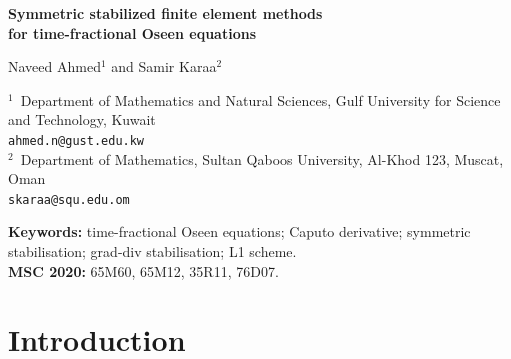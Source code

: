 \documentclass[11pt,a4paper]{article}
\numberwithin{equation}{section}
\theoremstyle{plain}
\theoremstyle{definition}
\theoremstyle{remark}
\begin{document}
\begin{center}
{\LARGE\bfseries Symmetric stabilized finite element methods\\[3pt] for time-fractional Oseen equations\par}
\vspace{1.2em}
{\large Naveed Ahmed$^{1}$ \quad and \quad Samir Karaa$^{2}$}\par
\vspace{0.7em}
{\small
$^{1}$\, Department of Mathematics and Natural Sciences, Gulf University for Science and Technology, Kuwait\\
\texttt{ahmed.n@gust.edu.kw}\\[2pt]
$^{2}$\, Department of Mathematics, Sultan Qaboos University, Al-Khod 123, Muscat, Oman\\
\texttt{skaraa@squ.edu.om}\par}
\end{center}
\vspace{0.6em}

\begin{abstract}
\noindent
We study inf--sup stable finite element discretizations of the 
time-fractional Oseen equations, stabilized by symmetric convection 
stabilization (local projection, continuous interior penalty, orthogonal 
subscale, or subgrid scale) and grad-div stabilization, for homogeneous 
Dirichlet boundary conditions and with an optional reaction term. We prove 
stability and error estimates for the semi-discrete problem and for the L1 
time discretization. The error analysis compares the discrete solution with 
a Fortin-type interpolant rather than a Stokes/Ritz projection; the $L^2$ 
norm of the error is controlled by a fractional Gronwall argument, and 
the pressure--divergence coupling by the grad-div term. 

\end{abstract}

\noindent\textbf{Keywords:} time-fractional Oseen equations; Caputo derivative; symmetric stabilisation; grad-div stabilisation; L1 scheme.\\
\textbf{MSC 2020:} 65M60, 65M12, 35R11, 76D07.

\section{Introduction}\label{sec:intro}


\end{document}
